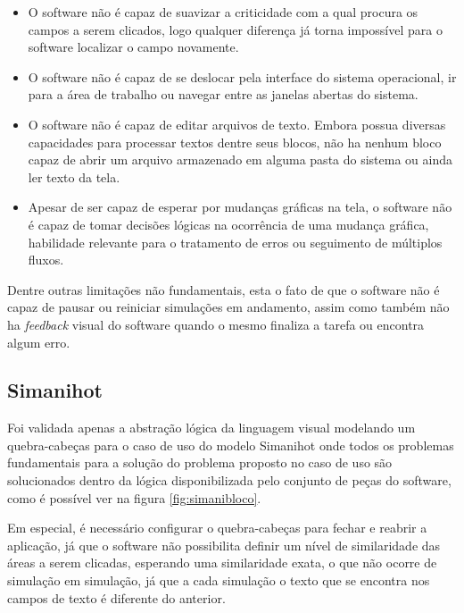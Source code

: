\documentclass[tg]{mdtufsm}
\begin{document}
            \begin{itemize}
                \item O software não é capaz de suavizar a criticidade com a qual procura os campos a serem clicados, logo qualquer diferença já torna impossível para o software localizar o campo novamente.
                \item O software não é capaz de se deslocar pela interface do sistema operacional, ir para a área de trabalho ou navegar entre as janelas abertas do sistema.
                \item O software não é capaz de editar arquivos de texto. Embora possua diversas capacidades para processar textos dentre seus blocos, não ha nenhum bloco capaz de abrir um arquivo armazenado em alguma pasta do sistema ou ainda ler texto da tela.
                \item Apesar de ser capaz de esperar por mudanças gráficas na tela, o software não é capaz de tomar decisões lógicas na ocorrência de uma mudança gráfica, habilidade relevante para o tratamento de erros ou seguimento de múltiplos fluxos.
            \end{itemize}

            Dentre outras limitações não fundamentais, esta o fato de que o software não é capaz de pausar ou reiniciar simulações em andamento, assim como também não ha \emph{feedback} visual do software quando o mesmo finaliza a tarefa ou encontra algum erro.

            \subsection {Simanihot}

            Foi validada apenas a abstração lógica da linguagem visual modelando um quebra-cabeças para o caso de uso do modelo Simanihot onde todos os problemas fundamentais para a solução do problema proposto no caso de uso são solucionados dentro da lógica disponibilizada pelo conjunto de peças do software, como é possível ver na figura \ref{fig:simanibloco}.

            Em especial, é necessário configurar o quebra-cabeças para fechar e reabrir a aplicação, já que o software não possibilita definir um nível de similaridade das áreas a serem clicadas, esperando uma similaridade exata, o que não ocorre de simulação em simulação, já que a cada simulação o texto que se encontra nos campos de texto é diferente do anterior.
\end{document}
